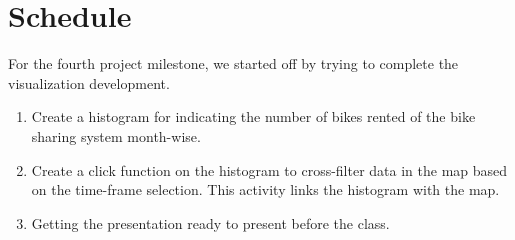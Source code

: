 \section{Schedule} 
\label{sec:schedule}

For the fourth project milestone, we started off by trying to complete the visualization development. 
\begin{enumerate}
    \item Create a histogram for indicating the number of bikes rented of the bike sharing system month-wise.
    \item Create a click function on the histogram to cross-filter data in the map based on the time-frame selection. This activity links the histogram with the map.
    \item Getting the presentation ready to present before the class.
\end{enumerate}

